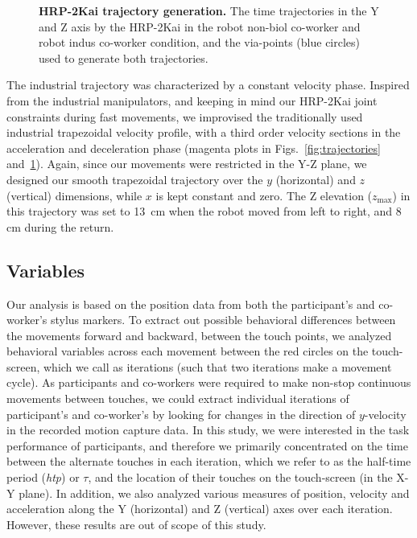 \begin{figure}[hpt]
	\caption{{\bf HRP-2Kai trajectory generation.} The time trajectories in the Y and Z axis by the HRP-2Kai in the robot non-biol co-worker and robot indus co-worker condition, and the via-points (blue circles) used to generate both trajectories.}
	\label{fig:trajectories2}
\end{figure}


The industrial trajectory was characterized by a constant velocity phase. Inspired from the industrial manipulators, and keeping in mind our HRP-2Kai joint constraints during fast movements, we improvised the traditionally used industrial trapezoidal velocity profile, with a third order velocity sections in the acceleration and deceleration phase (magenta plots in Figs.~\ref{fig:trajectories} and~\ref{fig:trajectories2}). Again, since our movements were restricted in the Y-Z plane, we designed our smooth trapezoidal trajectory over the $y$ (horizontal) and $z$ (vertical) dimensions, while $x$ is kept constant and zero. The Z elevation ($z_{\max}$) in this trajectory was set to 13~cm when the robot moved from left to right, and 8 cm during the return.


\subsection{Variables}

Our analysis is based on the position data from both the participant's and co-worker's stylus markers. To extract out possible behavioral differences between the movements forward and backward, between the touch points, we analyzed behavioral variables across each movement between the red circles on the touch-screen, which we call as iterations (such that two iterations make a movement cycle). As participants and co-workers were required to make non-stop continuous movements between touches, we could extract individual iterations of participant's and co-worker's by looking for changes in the direction of $y$-velocity in the recorded motion capture data. In this study, we were interested in the task performance of participants, and therefore we primarily concentrated on the time between the alternate touches in each iteration, which we refer to as the half-time period ({\it htp}) or $\tau$, and the location of their touches on the touch-screen (in the X-Y plane). In addition, we also analyzed various measures of position, velocity and acceleration along the Y (horizontal) and Z (vertical) axes over each iteration. However, these results are out of scope of this study.

